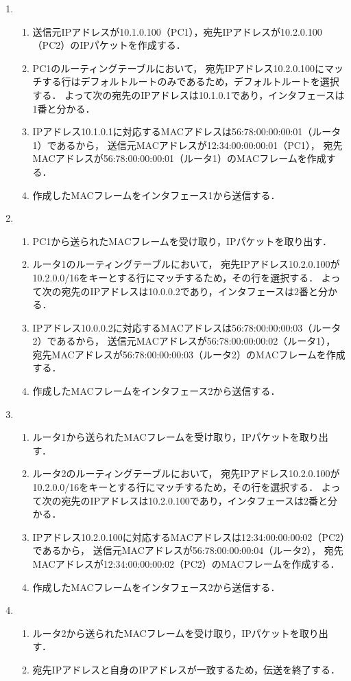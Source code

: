 \documentclass[a4paper]{bxjsarticle}
\begin{document}
\begin{enumerate}
\item \relax[PC1]
  \begin{enumerate}
  \item
    送信元IPアドレスが10.1.0.100（PC1），宛先IPアドレスが10.2.0.100（PC2）のIPパケットを作成する．
  \item
    PC1のルーティングテーブルにおいて，
    宛先IPアドレス10.2.0.100にマッチする行はデフォルトルートのみであるため，デフォルトルートを選択する．
    よって次の宛先のIPアドレスは10.1.0.1であり，インタフェースは1番と分かる．
  \item
    IPアドレス10.1.0.1に対応するMACアドレスは56:78:00:00:00:01（ルータ1）であるから，
    送信元MACアドレスが12:34:00:00:00:01（PC1），
    宛先MACアドレスが56:78:00:00:00:01（ルータ1）のMACフレームを作成する．
  \item
    作成したMACフレームをインタフェース1から送信する．
  \end{enumerate}
\item \relax[ルータ1]
  \begin{enumerate}
  \item
    PC1から送られたMACフレームを受け取り，IPパケットを取り出す．
  \item
    ルータ1のルーティングテーブルにおいて，
    宛先IPアドレス10.2.0.100が10.2.0.0/16をキーとする行にマッチするため，その行を選択する．
    よって次の宛先のIPアドレスは10.0.0.2であり，インタフェースは2番と分かる．
  \item
    IPアドレス10.0.0.2に対応するMACアドレスは56:78:00:00:00:03（ルータ2）であるから，
    送信元MACアドレスが56:78:00:00:00:02（ルータ1），
    宛先MACアドレスが56:78:00:00:00:03（ルータ2）のMACフレームを作成する．
  \item
    作成したMACフレームをインタフェース2から送信する．
  \end{enumerate}
\item \relax[ルータ2]
  \begin{enumerate}
  \item
    ルータ1から送られたMACフレームを受け取り，IPパケットを取り出す．
  \item
    ルータ2のルーティングテーブルにおいて，
    宛先IPアドレス10.2.0.100が10.2.0.0/16をキーとする行にマッチするため，その行を選択する．
    よって次の宛先のIPアドレスは10.2.0.100であり，インタフェースは2番と分かる．
  \item
    IPアドレス10.2.0.100に対応するMACアドレスは12:34:00:00:00:02（PC2）であるから，
    送信元MACアドレスが56:78:00:00:00:04（ルータ2），
    宛先MACアドレスが12:34:00:00:00:02（PC2）のMACフレームを作成する．
  \item
    作成したMACフレームをインタフェース2から送信する．
  \end{enumerate}
\item \relax[PC2]
  \begin{enumerate}
  \item
    ルータ2から送られたMACフレームを受け取り，IPパケットを取り出す．
  \item
    宛先IPアドレスと自身のIPアドレスが一致するため，伝送を終了する．
  \end{enumerate}
\end{enumerate}
\end{document}
